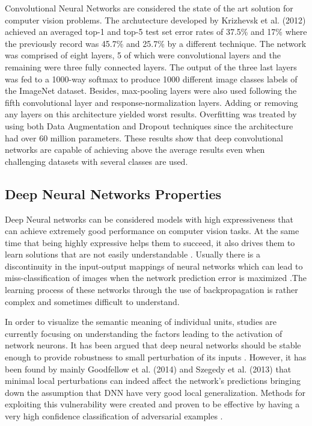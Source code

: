 Convolutional Neural Networks are considered the state of the art solution for computer vision problems. The archutecture developed by Krizhevsk et al. (2012) achieved an averaged top-1 and top-5 test set error rates of 37.5\% and 17\% where the previously record was 45.7\% and 25.7\% by a different technique. The network was comprised of eight layers, 5 of which were convolutional layers and the remaining were three fully connected layers. The output of the three last layers was fed to a 1000-way softmax to produce 1000 different image classes labels of the ImageNet dataset. Besides, max-pooling layers were also used following the fifth convolutional layer and response-normalization layers. Adding or removing any layers on this architecture yielded worst results. Overfitting was treated by using both Data Augmentation and Dropout \cite{hinton2012improving} techniques since the architecture had over 60 million parameters. These results show that deep convolutional networks are capable of achieving above the average results even when challenging datasets with several classes are used.

\subsection{Deep Neural Networks Properties}\label{subsec: nn_props}

Deep Neural networks can be considered models with high expressiveness that can achieve extremely good performance on computer vision tasks. At the same time that being highly expressive helps them to succeed, it also drives them to learn solutions that are not easily understandable \cite{szegedy2013}. Usually there is a discontinuity in the input-output mappings of neural networks which can lead to miss-classification of images when the network prediction error is maximized \cite{gu2014}.The learning process of these networks through the use of backpropagation is rather complex and sometimes difficult to understand.

In order to visualize the semantic meaning of individual units, studies are currently focusing on understanding the factors leading to the activation of network neurons. It has been argued that deep neural networks should be stable enough to provide robustness to small perturbation of its inputs \cite{szegedy2013}. However, it has been found by mainly Goodfellow et al. (2014) and Szegedy et al. (2013) that minimal local perturbations can indeed affect the network's predictions bringing down the assumption that DNN have very good local generalization. Methods for exploiting this vulnerability were created and proven to be effective by having a very high confidence classification of adversarial examples \cite{goodfellow2016}.

